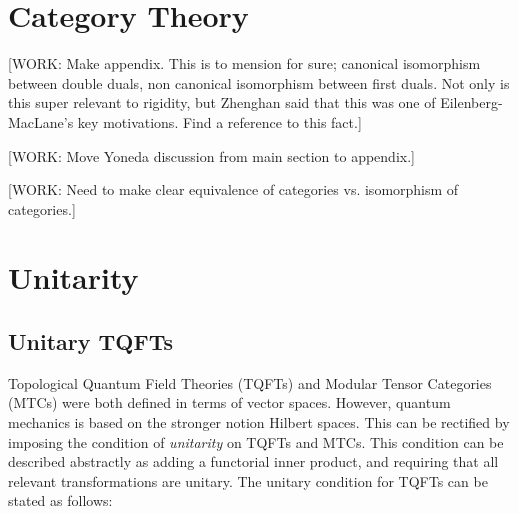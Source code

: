 \documentclass{article}
\theoremstyle{definition}
\numberwithin{figure}{section}
\begin{document}
\section{Category Theory}
\label{Categories}
[WORK: Make appendix. This is to mension for sure; canonical isomorphism between double duals, non canonical isomorphism between first duals. Not only is this super relevant to rigidity, but Zhenghan said that this was one of Eilenberg-MacLane's key motivations. Find a reference to this fact.]

[WORK: Move Yoneda discussion from main section to appendix.]

[WORK: Need to make clear equivalence of categories vs. isomorphism of categories.]
\section{Unitarity}
\label{Unitarity}

\subsection{Unitary TQFTs}

Topological Quantum Field Theories (TQFTs) and Modular Tensor Categories (MTCs) were both defined in terms of vector spaces. However, quantum mechanics is based on the stronger notion Hilbert spaces. This can be rectified by imposing the condition of \textit{unitarity} on TQFTs and MTCs. This condition can be described abstractly as adding a functorial inner product, and requiring that all relevant transformations are unitary. The unitary condition for TQFTs can be stated as follows:
\end{document}
